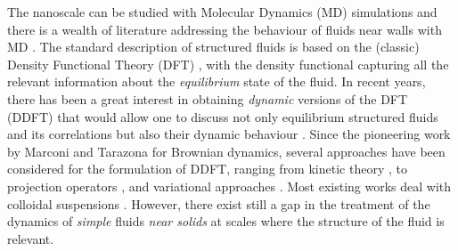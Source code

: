 \documentclass[b5paper,openright,10pt]{book}
\begin{document}
The
nanoscale can be studied with Molecular Dynamics (MD) simulations and there
is  a wealth  of literature  addressing the  behaviour of  fluids near
walls  with  MD \cite{Koplik1995,Wang2017}.   
The standard  description of structured fluids is  based on the
(classic) Density Functional Theory (DFT) \cite{Evans1979}, with the density
functional   capturing  all   the  relevant   information  about   the
\textit{equilibrium} state  of the fluid.   In recent years,  there has
been a  great interest in  obtaining \textit{dynamic} versions  of the
DFT (DDFT) that would allow one  to discuss not
only equilibrium structured fluids and its correlations but also their
dynamic  behaviour \cite{Lowen2003,Evans2016}.   Since the  pioneering
work by Marconi and Tarazona  \cite{Marconi2000} for Brownian dynamics, several approaches
have been considered  for the formulation of DDFT,
ranging from  kinetic theory  \cite{Guo2006}, to  projection operators
\cite{Espanol2009a},  and variational  approaches \cite{Schmidt2013}.
Most    existing    works     deal    with    colloidal    suspensions
\cite{Goddard2012,Evans2016}. However, there exist  still a gap in the
treatment  of the dynamics of \textit{simple}  fluids \textit{near  solids} at  scales
where  the  structure  of  the  fluid  is  relevant.   
\end{document}
